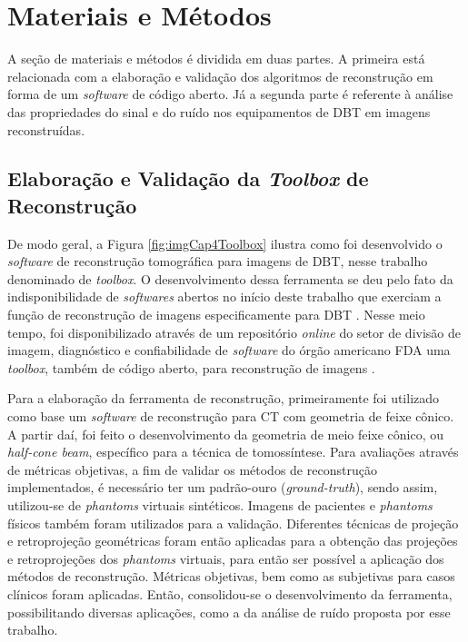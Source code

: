 \chapter[Materiais e Métodos]{Materiais e Métodos}\label{Capitulo5}
 

A seção de materiais e métodos é dividida em duas partes. A primeira está relacionada com a elaboração e validação dos algoritmos de reconstrução em forma de um \textit{software} de código aberto. Já a segunda parte é referente à análise das propriedades do sinal e do ruído nos equipamentos de \acs{DBT} em imagens reconstruídas. 

\section{Elaboração e Validação da \textit{Toolbox} de Reconstrução}

De modo geral, a Figura \ref{fig:imgCap4Toolbox} ilustra como foi desenvolvido o \textit{software} de reconstrução tomográfica para imagens de \acs{DBT}, nesse trabalho denominado de \textit{toolbox}. O desenvolvimento dessa ferramenta se deu pelo fato da indisponibilidade de \textit{softwares} abertos no início deste trabalho que exerciam a  função de reconstrução de imagens especificamente para \acs{DBT} . Nesse meio tempo, foi disponibilizado através de um repositório \textit{online} do setor de divisão de imagem, diagnóstico e confiabilidade de \textit{software} do órgão americano \acs{FDA} uma \textit{toolbox}, também de código aberto, para reconstrução de imagens \cite{Zengtoolbox}.  

Para a elaboração da ferramenta de reconstrução, primeiramente foi utilizado como base um \textit{software} de reconstrução para \acs{CT} com geometria de feixe cônico. A partir daí, foi feito o desenvolvimento da geometria de meio feixe cônico, ou \textit{half-cone beam}, específico para a técnica de tomossíntese. Para avaliações através de métricas objetivas, a fim de  validar os métodos de reconstrução implementados, é necessário ter um padrão-ouro (\textit{ground-truth}), sendo assim, utilizou-se de \textit{phantoms} virtuais sintéticos. Imagens de pacientes e \textit{phantoms} físicos também foram utilizados para a validação. Diferentes técnicas de projeção e retroprojeção geométricas foram então aplicadas para a obtenção das projeções e retroprojeções dos \textit{phantoms} virtuais, para então ser possível a aplicação dos métodos de reconstrução. Métricas objetivas, bem como as subjetivas para casos clínicos foram aplicadas. Então, consolidou-se o desenvolvimento da ferramenta, possibilitando diversas aplicações, como a da análise de ruído proposta por esse trabalho.

